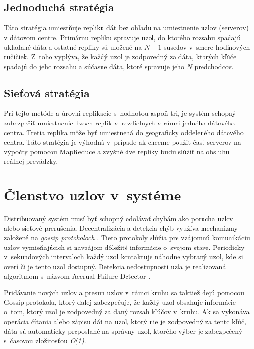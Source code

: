 \documentclass[11pt,twoside,a4paper]{book}
\begin{document}
\subsection*{Jednoduchá stratégia}

Táto stratégia umiestňuje repliku dát bez ohľadu na umiestnenie uzlov (serverov) v dátovom centre. Primárnu repliku spravuje uzol, do ktorého rozsahu spadajú ukladané dáta a ostatné repliky sú uložené na $N - 1$ susedov v~smere hodinových ručičiek. Z~toho vyplýva, že každý uzol je zodpovedný za dáta, ktorých kľúče spadajú do jeho rozsahu a súčasne dáta, ktoré spravuje jeho $N$ predchodcov.

\subsection*{Sieťová stratégia}

Pri tejto metóde a úrovni replikácie s~hodnotou aspoň tri, je systém schopný zabezpečiť umiestnenie dvoch replík v~rozdielnych \emph{} v rámci jedného dátového centra. Tretia replika môže byť umiestnená do geograficky oddeleného dátového centra. Táto stratégia je výhodná v~prípade ak chceme použiť časť serverov na výpočty pomocou MapReduce a zvyšné dve repliky budú slúžiť na obsluhu reálnej prevádzky.

\section{Členstvo uzlov v~systéme}

Distribuovaný systém musí byť schopný odolávať chybám ako porucha uzlov alebo sieťové prerušenia. Decentralizácia a detekcia chýb využíva mechanizmy založené na \emph{gossip protokoloch} \cite{ganesh2003peer}. Tieto protokoly slúžia pre vzájomnú komunikáciu uzlov vymieňajúcich si navzájom dôležité informácie o~svojom stave. Periodicky v~sekundových intervaloch každý uzol kontaktuje náhodne vybraný uzol, kde si overí či je tento uzol dostupný. Detekcia nedostupnosti uzla je realizovaná algoritmom s~názvom Accrual Failure Detector \cite{hayashibara2004}.

Pridávanie nových uzlov a presun uzlov v~rámci kruhu sa taktiež dejú pomocou Gossip protokolu, ktorý ďalej zabezpečuje, že každý uzol obsahuje informácie o~tom, ktorý uzol je zodpovedný za daný rozsah kľúčov v~kruhu. Ak sa vykonáva operácia čítania alebo zápisu dát na uzol, ktorý nie je zodpovedný za tento kľúč, dáta sú automaticky preposlané na správny uzol, ktorého výber je zabezpečený s~časovou zložitosťou \textit{O(1)}.
\end{document}
